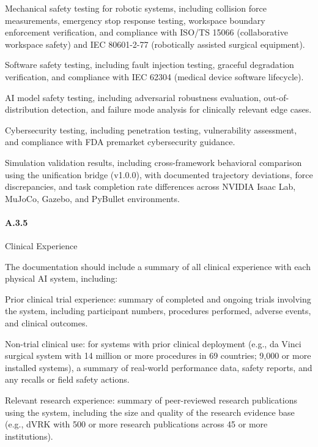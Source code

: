 \begin{description}[leftmargin=2.5cm,style=sameline]

\item[(a)] Mechanical safety testing for robotic systems, including collision force measurements, emergency stop response testing, workspace boundary enforcement verification, and compliance with ISO/TS 15066 (collaborative workspace safety) and IEC 80601-2-77 (robotically assisted surgical equipment).

\item[(b)] Software safety testing, including fault injection testing, graceful degradation verification, and compliance with IEC 62304 (medical device software lifecycle).

\item[(c)] AI model safety testing, including adversarial robustness evaluation, out-of-distribution detection, and failure mode analysis for clinically relevant edge cases.

\item[(d)] Cybersecurity testing, including penetration testing, vulnerability assessment, and compliance with FDA premarket cybersecurity guidance.

\item[(e)] Simulation validation results, including cross-framework behavioral comparison using the unification bridge (v1.0.0), with documented trajectory deviations, force discrepancies, and task completion rate differences across NVIDIA Isaac Lab, MuJoCo, Gazebo, and PyBullet environments.

\end{description}

\paragraph{A.3.5} Clinical Experience

The documentation should include a summary of all clinical experience with each physical AI system, including:

\begin{description}[leftmargin=2.5cm,style=sameline]

\item[(a)] Prior clinical trial experience: summary of completed and ongoing trials involving the system, including participant numbers, procedures performed, adverse events, and clinical outcomes.

\item[(b)] Non-trial clinical use: for systems with prior clinical deployment (e.g., da Vinci surgical system with 14 million or more procedures in 69 countries; 9,000 or more installed systems), a summary of real-world performance data, safety reports, and any recalls or field safety actions.

\item[(c)] Relevant research experience: summary of peer-reviewed research publications using the system, including the size and quality of the research evidence base (e.g., dVRK with 500 or more research publications across 45 or more institutions).

\end{description}


